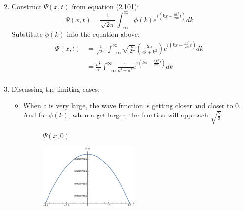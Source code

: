 \documentclass{article}
\begin{document}
\begin{enumerate}[label=(\alph*)]
\begin{align*}
	      \end{align*}
	\item Construct \(\Psi(x,t)\) from equation (2.101):
	      \[\Psi(x,t) = \frac{1}{\sqrt{2\pi}}\int_{-\infty}^{\infty} \phi(k) e^{i (kx -\frac{hk^2}{2m }t)}dk \]
	      Substitute \(\phi(k)\) into the equation above:
	      \begin{align*}
		      \Psi(x,t) & = \frac{1}{\sqrt{2\pi}}\int_{-\infty}^{\infty} \sqrt{\frac{a}{2\pi}} \left(\frac{2a}{a^2 + k^2 }\right) e^{i (kx -\frac{hk^2}{2m }t)}dk \\
		                & = \frac{a^{\frac{3}{2}}}{\pi} \int_{-\infty}^{\infty} \frac{1}{k^2 + a^2} e^{i (kx -\frac{hk^2}{2m }t)}dk                               \\
	      \end{align*}
	\item Discussing the limiting cases:
	      \begin{itemize}
		      \item When a is very large, the wave function is getting closer and closer to 0. And for \(\phi(k)\), when a get larger, the function will approach \(\sqrt{\frac{2}{\pi}}\)
		            \begin{figure}[H]
			            \centering
			            \caption{\(\Psi(x,0)\)}
			            \label{fig:subfigures}
		            \end{figure}
		            \begin{figure}[H]
			            \centering
			            \includegraphics[width=0.5\textwidth]{phi.pdf}

\end{figure}
\end{itemize}
\end{enumerate}
\end{document}
